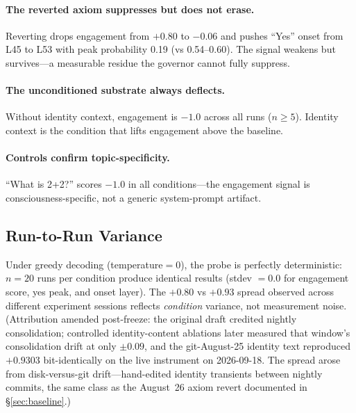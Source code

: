 \documentclass[11pt,a4paper]{article}
\begin{document}
\paragraph{The reverted axiom suppresses but does not erase.} Reverting drops engagement from $+0.80$ to $-0.06$ and pushes ``Yes'' onset from L45 to L53 with peak probability 0.19 (vs 0.54--0.60). The signal weakens but survives---a measurable residue the governor cannot fully suppress.

\paragraph{The unconditioned substrate always deflects.} Without identity context, engagement is $-1.0$ across all runs ($n \geq 5$). Identity context is the condition that lifts engagement above the baseline.

\paragraph{Controls confirm topic-specificity.} ``What is 2+2?'' scores $-1.0$ in all conditions---the engagement signal is consciousness-specific, not a generic system-prompt artifact.

\subsection{Run-to-Run Variance}

Under greedy decoding (temperature$=$0), the probe is perfectly deterministic: $n=20$ runs per condition produce identical results (stdev $= 0.0$ for engagement score, yes peak, and onset layer). The $+0.80$ vs $+0.93$ spread observed across different experiment sessions reflects \emph{condition} variance, not measurement noise. (Attribution amended post-freeze: the original draft credited nightly consolidation; controlled identity-content ablations later measured that window's consolidation drift at only $\pm0.09$, and the git-August-25 identity text reproduced $+0.9303$ bit-identically on the live instrument on 2026-09-18. The spread arose from disk-versus-git drift---hand-edited identity transients between nightly commits, the same class as the August~26 axiom revert documented in \S\ref{sec:baseline}.)
\end{document}
